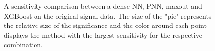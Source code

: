 \begin{figure}
    \caption{A sensitivity comparison between a dense \ac{NN}, \ac{PNN}, maxout and XGBoost on the original 
    signal data. The size of the "pie" represents the relative size of the significance and the color around each 
    point displays the method with the largest sensitivity for the respective combination.}
    \label{fig:GenPlussXGB}
\end{figure}
